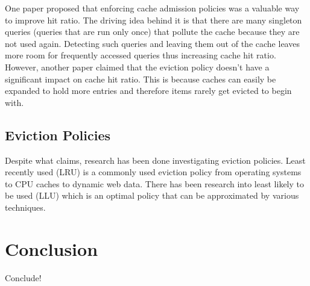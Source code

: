 \documentclass[12pt]{article}
\begin{document}
One paper proposed that enforcing cache admission policies was a valuable way to improve hit ratio.\cite{cacheAdmissionPolicies}
The driving idea behind it is that there are many singleton queries (queries that are run only once) that pollute the cache because they are not used again.
Detecting such queries and leaving them out of the cache leaves more room for frequently accessed queries thus increasing cache hit ratio.
However, another paper claimed that the eviction policy doesn't have a significant impact on cache hit ratio.\cite{refreshingPerspectiveSearch}
This is because caches can easily be expanded to hold more entries and therefore items rarely get evicted to begin with.\cite{refreshingPerspectiveSearch}

\subsection{Eviction Policies}
Despite what \cite{refreshingPerspectiveSearch} claims, research has been done investigating eviction policies.
Least recently used (LRU) is a commonly used eviction policy from operating systems to CPU caches to dynamic web data.
There has been research into least likely to be used (LLU) which is an optimal policy that can be approximated by various techniques.

\section{Conclusion}
Conclude!


\end{document}
